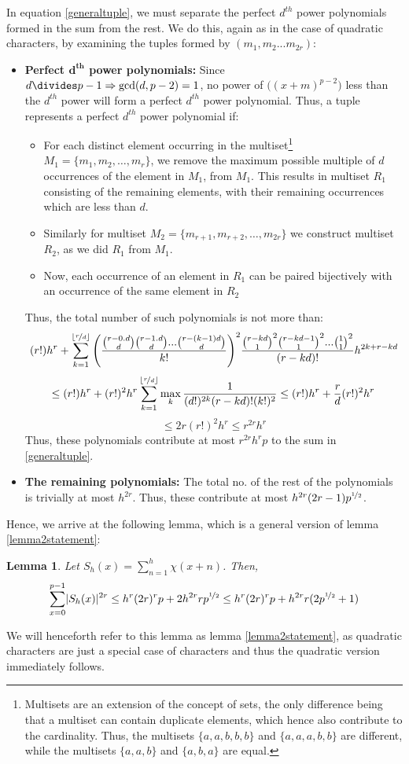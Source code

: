 \documentclass{report}
\newtheorem*{lemma*}{Lemma}
\begin{document}
In equation \ref{generaltuple}, we must separate the perfect $d^{th}$ power polynomials formed in the sum from the rest. We do this, again as in the case of quadratic characters, by examining the tuples formed by $(m_1, m_2...m_{2r})$:
\renewcommand{\labelitemii}{$\circ$}
\begin{itemize}
\item \textbf{Perfect $\boldsymbol{d^{th}}$ power polynomials:} Since $d \divides p-1\Rightarrow \gcd(d, p-2)=1$, no power of $\big((x+m)^{p-2}\big)$ less than the $d^{th}$ power will form a perfect $d^{th}$ power polynomial. Thus, a tuple represents a perfect $d^{th}$ power polynomial if:
\begin{itemize}
    \item For each distinct element occurring in the multiset\footnote{Multisets are an extension of the concept of sets, the only difference being that a multiset can contain duplicate elements, which hence also contribute to the cardinality. Thus, the multisets $\{a, a, b, b, b\}$ and $\{a, a, a, b, b\}$ are different, while the multisets $\{a, a, b\}$ and $\{a, b, a\}$ are equal.} $M_1=\{m_1,m_2,\ldots, m_r\}$, we remove the maximum possible multiple of $d$ occurrences of the element in $M_1$, from $M_1$. This results in multiset $R_1$ consisting of the remaining elements, with their remaining occurrences which are less than $d$.
    \item Similarly for multiset $M_2=\{m_{r+1}, m_{r+2}, \ldots, m_{2r}\}$ we construct multiset $R_2$, as we did $R_1$ from $M_1$.
    \item Now, each occurrence of an element in $R_1$ can be paired bijectively with an occurrence of the same element in $R_2$
\end{itemize}
Thus, the total number of such polynomials is not more than:
\[ (r!)h^r+\sum_{k=1}^{\lfloor\nicefrac{r}{d}\rfloor}\Bigg(\frac{\binom{r-0.d}{d}\binom{r-1.d}{d}...\binom{r-(k-1)d}{d}}{k!}\Bigg)^2\frac{\binom{r-kd}{1}^2\binom{r-kd-1}{1}^2...\binom{1}{1}^2}{(r-kd)!}h^{2k+r-kd}\]
\[
\leq (r!)h^r+(r!)^2 h^{r}\sum_{k=1}^{\lfloor\nicefrac{r}{d}\rfloor}\max_k \frac{1}{(d!)^{2k}(r-kd)!(k!)^2} \leq (r!)h^r+ \frac{r}{d}(r!)^2 h^{r}
\]
\[ \leq 2r(r!)^2 h^{r} \leq r^{2r}h^r \]
Thus, these polynomials contribute at most $r^{2r}h^rp$ to the sum in \ref{generaltuple}.
\item \textbf{The remaining polynomials:} The total no. of the rest of the polynomials is trivially at most $h^{2r}$. Thus, these contribute at most $h^{2r}(2r-1)p^{\nicefrac{1}{2}}$.
\end{itemize}
Hence, we arrive at the following lemma, which is a general version of lemma \ref{lemma2statement}:
\begin{lemma*}
Let $S_h(x)=\sum\limits_{n=1}^{h}\chi(x+n)$. Then,
\begin{equation} \label{lemma2gen}
\sum\limits_{x=0}^{p-1}\lvert S_h(x)\rvert^{2r}\leq h^{r}(2r)^{r}p+2h^{2r}rp^{\nicefrac{1}{2}}\leq h^{r}(2r)^{r}p+h^{2r}r(2p^{\nicefrac{1}{2}}+1)
\end{equation}
\end{lemma*}
We will henceforth refer to this lemma as lemma \ref{lemma2statement}, as quadratic characters are just a special case of characters and thus the quadratic version immediately follows.
\end{document}
